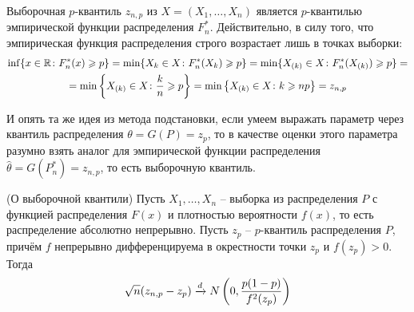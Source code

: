 \begin{note}
    Выборочная $p$-квантиль $z_{n, p}$ из $X = (X_1, \dots, X_n)$ является $p$-квантилью эмпирической функции распределения $F_n^*$. Действительно, в силу того, что эмпирическая функция распределения строго возрастает лишь в точках выборки:
    \begin{multline*}
        \inf \{x \in \mathbb{R} \colon F_n^*(x) \geqslant p\} = \min \{X_k \in X \colon F_n^*(X_k) \geqslant p\} = \min \{X_{(k)} \in X \colon F_n^*(X_{(k)}) \geqslant p\} =
        \\
        = \min \left\{X_{(k)} \in X \colon \frac{k}{n} \geqslant p\right\} = \min \left\{X_{(k)} \in X \colon k \geqslant np\right\} = z_{n,p}
    \end{multline*}
\end{note}

\begin{note}
    И опять та же идея из метода подстановки, если умеем выражать параметр через квантиль распределения $\theta = G(P) = z_p$, то в качестве оценки этого параметра разумно взять аналог для эмпирической функции распределения $\hat{\theta} = G(P_n^*) = z_{n, p}$, то есть выборочную квантиль.
\end{note}

\begin{theorem} (О выборочной квантили)
    Пусть $X_1, \dots, X_n$ -- выборка из распределения $P$ с функцией распределения $F(x)$ и плотностью вероятности $f(x)$, то есть распределение абсолютно непрерывно. Пусть $z_p$ -- $p$-квантиль распределения $P$, причём $f$ непрерывно дифференцируема в окрестности точки $z_p$ и $f(z_p) > 0$. Тогда
    \[
        \sqrt{n}(z_{n,p} - z_p) \xrightarrow{d} N\left(0, \frac{p(1-p)}{f^2(z_p)}\right)
    \]
\end{theorem}

